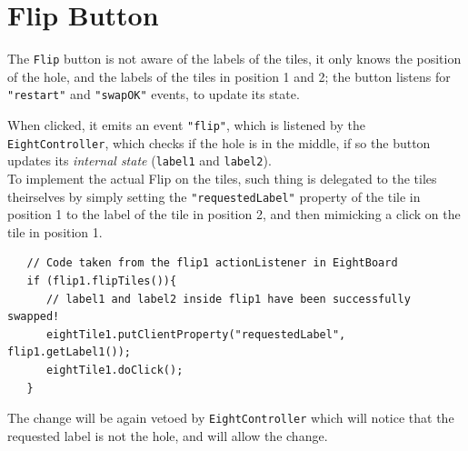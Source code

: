 \section{Flip Button}

The \lstinline|Flip| button is not aware of the labels of the tiles, it only knows the position of the hole, and the labels of the tiles in position 1 and 2; the button listens for \lstinline|"restart"| and \lstinline|"swapOK"| events, to update its state.

When clicked, it emits an event \lstinline|"flip"|, which is listened by the \lstinline|EightController|, which checks if the hole is in the middle, if so the button updates its \textit{internal state} (\lstinline|label1| and \lstinline|label2|).\\
To implement the actual Flip on the tiles, such thing is delegated to the tiles theirselves by simply setting the \lstinline|"requestedLabel"| property of the tile in position 1 to the label of the tile in position 2, and then mimicking a click on the tile in position 1.

\begin{lstlisting}
   // Code taken from the flip1 actionListener in EightBoard
   if (flip1.flipTiles()){
      // label1 and label2 inside flip1 have been successfully swapped!
      eightTile1.putClientProperty("requestedLabel", flip1.getLabel1());
      eightTile1.doClick();
   }
\end{lstlisting}

The change will be again vetoed by \lstinline|EightController| which will notice that the requested label is not the hole, and will allow the change.

